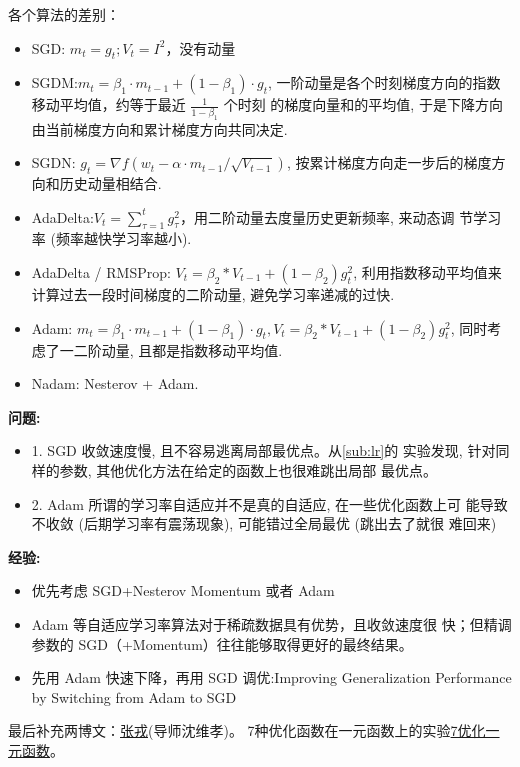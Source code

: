 \documentclass[UTF8]{ctexart}
\begin{document}
各个算法的差别：
\begin{itemize}
	\item SGD: $m_t=g_t; V_t=I^2$，没有动量
	\item SGDM:$m_{t}=\beta_{1} \cdot m_{t-1}+\left(1-\beta_{1}\right) \cdot g_{t}$,
	一阶动量是各个时刻梯度方向的指数移动平均值，约等于最近 $\frac{1}{1 - \beta_1}$ 个时刻
	的梯度向量和的平均值, 于是下降方向由当前梯度方向和累计梯度方向共同决定.
	\item SGDN: $g_{t}=\nabla f\left(w_{t}-\alpha \cdot m_{t-1} / \sqrt{V_{t-1}}\right)$,
	按累计梯度方向走一步后的梯度方向和历史动量相结合.
	\item AdaDelta:$V_{t}=\sum_{\tau=1}^{t} g_{\tau}^{2}$，用二阶动量去度量历史更新频率, 来动态调
	节学习率 (频率越快学习率越小).
	\item AdaDelta / RMSProp: $V_{t}=\beta_{2} * V_{t-1}+\left(1-\beta_{2}\right) g_{t}^{2}$,
	利用指数移动平均值来计算过去一段时间梯度的二阶动量, 避免学习率递减的过快.
	\item Adam: $m_{t}=\beta_{1} \cdot m_{t-1}+\left(1-\beta_{1}\right) \cdot g_{t}, 
	V_{t}=\beta_{2} * V_{t-1}+\left(1-\beta_{2}\right) g_{t}^{2}$,
	同时考虑了一二阶动量, 且都是指数移动平均值.
	\item Nadam: Nesterov + Adam.
\end{itemize}

\textbf{问题:}
\begin{itemize}
	\item 1. SGD 收敛速度慢, 且不容易逃离局部最优点。从\ref{sub:lr}的
	实验发现, 针对同样的参数, 其他优化方法在给定的函数上也很难跳出局部
	最优点。
	\item 2. Adam 所谓的学习率自适应并不是真的自适应, 在一些优化函数上可
	能导致不收敛 (后期学习率有震荡现象), 可能错过全局最优 (跳出去了就很
	难回来)
\end{itemize}

\textbf{经验:}
\begin{itemize}
	\item 优先考虑 SGD+Nesterov Momentum 或者 Adam
	\item Adam 等自适应学习率算法对于稀疏数据具有优势，且收敛速度很
	快；但精调参数的 SGD（+Momentum）往往能够取得更好的最终结果。
	\item 先用 Adam 快速下降，再用 SGD 调优:Improving Generalization
	Performance by Switching from Adam to SGD
\end{itemize}

最后补充两博文：\href{https://zhuanlan.zhihu.com/p/43506482}{张戎}(导师沈维孝)。
7种优化函数在一元函数上的实验\href{https://zhuanlan.zhihu.com/p/41799394}{7优化一元函数}。
\end{document}
